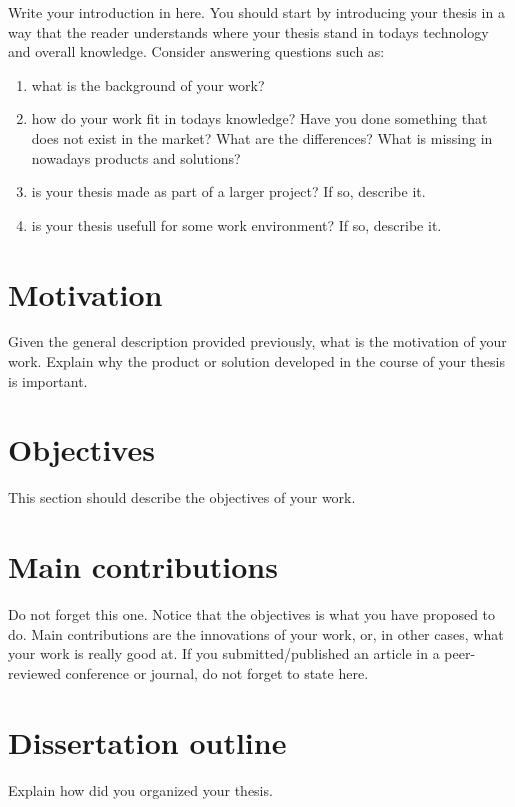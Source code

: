 Write your introduction in here. You should start by introducing your thesis in a way that the reader understands where your thesis stand in todays technology and overall knowledge. Consider answering questions such as:
\begin{enumerate}
 \item what is the background of your work?
 \item how do your work fit in todays knowledge? Have you done something that does not exist in the market? What are the differences? What is missing in nowadays products and solutions?
 \item is your thesis made as part of a larger project? If so, describe it.
 \item is your thesis usefull for some work environment? If so, describe it.
\end{enumerate}

\section{Motivation}

Given the general description provided previously, what is the motivation of your work. Explain why the product or solution developed in the course of your thesis is important.

\section{Objectives}

This section should describe the objectives of your work.

\section{Main contributions}
Do not forget this one. Notice that the objectives is what you have proposed to do. Main contributions are the innovations of your work, or, in other cases, what your work is really good at. If you submitted/published an article in a peer-reviewed conference or journal, do not forget to state here.

\section{Dissertation outline}

Explain how did you organized your thesis.

%
% 
% 
% 

\cleardoublepage 
